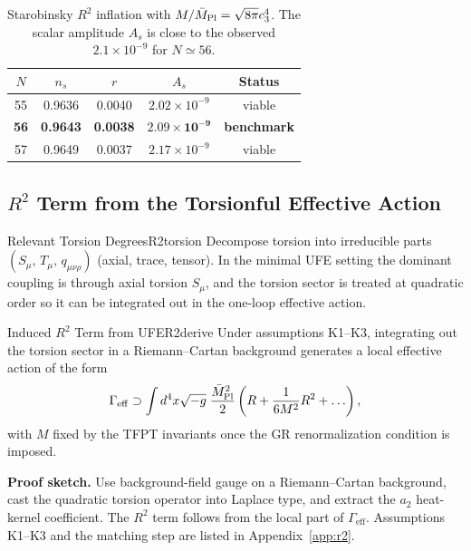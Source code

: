 \begin{table}[H]
\centering
\begin{tabular}{@{}ccccc@{}}
\toprule
$N$ & $n_s$ & $r$ & $A_s$ & \textbf{Status}\\
\midrule
55 & 0.9636 & 0.0040 & $2.02\times10^{-9}$ & viable\\
\textbf{56} & \textbf{0.9643} & \textbf{0.0038} & $\mathbf{2.09\times10^{-9}}$ & \textbf{benchmark}\\
57 & 0.9649 & 0.0037 & $2.17\times10^{-9}$ & viable\\
\bottomrule
\end{tabular}
\caption{Starobinsky $R^2$ inflation with $M/\bar{M}_{\mathrm{Pl}}=\sqrt{8\pi}c_3^4$. The scalar amplitude $A_s$ is close to the observed $2.1\times10^{-9}$ for $N\simeq 56$.}
\label{tab:inflation}
\end{table}

\subsection{\texorpdfstring{$R^2$ Term from the Torsionful Effective Action}{R2 Term from the Torsionful Effective Action}}
\label{sec:r2derive}

\begin{definition}{Relevant Torsion Degrees}{R2torsion}
Decompose torsion into irreducible parts $(S_\mu,\,T_\mu,\,q_{\mu\nu\rho})$ (axial, trace, tensor).
In the minimal UFE setting the dominant coupling is through axial torsion $S_\mu$, and the
torsion sector is treated at quadratic order so it can be integrated out in the one-loop
effective action.
\end{definition}

\begin{theorem}{Induced $R^2$ Term from UFE}{R2derive}
Under assumptions K1--K3, integrating out the torsion sector in a Riemann--Cartan background
generates a local effective action of the form
\begin{equation}
    \Gamma_{\mathrm{eff}} \supset \int d^4x\sqrt{-g}\;\frac{\bar{M}_{\mathrm{Pl}}^2}{2}
    \left(R + \frac{1}{6M^2}R^2 + \ldots\right),
\end{equation}
with $M$ fixed by the TFPT invariants once the GR renormalization condition is imposed.
\end{theorem}

\textbf{Proof sketch.} Use background-field gauge on a Riemann--Cartan background, cast the
quadratic torsion operator into Laplace type, and extract the $a_2$ heat-kernel coefficient.
The $R^2$ term follows from the local part of $\Gamma_{\mathrm{eff}}$. Assumptions K1--K3 and
the matching step are listed in Appendix~\ref{app:r2}.

